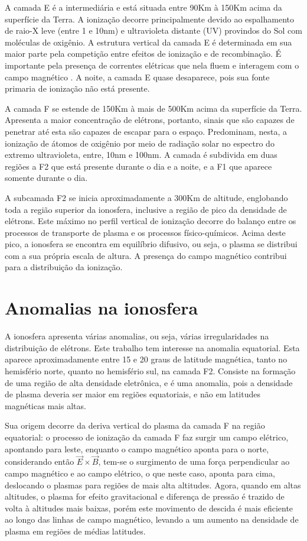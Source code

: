 A camada E é a intermediária e está situada entre 90Km à 150Km acima da superfície da Terra. A ionização decorre principalmente devido ao espalhamento de raio-X leve (entre 1 e 10nm) e ultravioleta distante (UV) provindos do Sol com moléculas de oxigênio. A estrutura vertical da camada E é determinada em sua maior parte pela competição entre efeitos de ionização e de recombinação. É importante pela presença de correntes elétricas que nela fluem e interagem com o campo magnético \cite{KIRCHHOFF:1991}. A noite, a camada E quase desaparece, pois sua fonte primaria de ionização não está presente.

A camada F se estende de 150Km à mais de 500Km acima da superfície da Terra. Apresenta a maior concentração de elétrons, portanto, sinais que são capazes de penetrar até esta são capazes de escapar para o espaço. Predominam, nesta, a ionização de átomos de oxigênio por meio de radiação solar no espectro do extremo ultravioleta, entre, 10nm e 100nm. A camada é subdivida em duas regiões a F2 que está presente durante o dia e a noite, e a F1 que aparece somente durante o dia. 

A subcamada F2 se inicia aproximadamente a 300Km de altitude, englobando toda a região superior da ionosfera, inclusive a região de pico da densidade de elétrons. Este máximo no perfil vertical de ionização decorre do balanço entre os processos de transporte de plasma e os processos físico-químicos. Acima deste pico, a ionosfera se encontra em equilíbrio difusivo, ou seja, o plasma se distribui com a sua própria escala de altura. A presença do campo magnético contribui para a distribuição da ionização.

\section{Anomalias na ionosfera}

A ionosfera apresenta várias anomalias, ou seja, várias irregularidades na distribuição de elétrons. Este trabalho tem interesse na anomalia equatorial. Esta aparece aproximadamente entre 15 e 20 graus de latitude magnética, tanto no hemisfério norte, quanto no hemisfério sul, na camada F2. Consiste na formação de uma região de alta densidade eletrônica, e é uma anomalia, pois a densidade de plasma deveria ser maior em regiões equatoriais, e não em latitudes magnéticas mais altas.

Sua origem decorre da deriva vertical do plasma da camada F na região equatorial: o processo de ionização da camada F faz surgir um campo elétrico, apontando para leste, enquanto o campo magnético aponta para o norte, considerando então $\vec{E}\times\vec{B}$, tem-se o surgimento de uma força perpendicular ao campo magnético e ao campo elétrico, o que neste caso, aponta para cima, deslocando o plasmas para regiões de mais alta altitudes. Agora, quando em altas altitudes, o plasma for efeito gravitacional e diferença de pressão é trazido de volta à altitudes mais baixas, porém este movimento de descida é mais eficiente ao longo das linhas de campo magnético, levando a um aumento na densidade de plasma em regiões de médias latitudes. 

